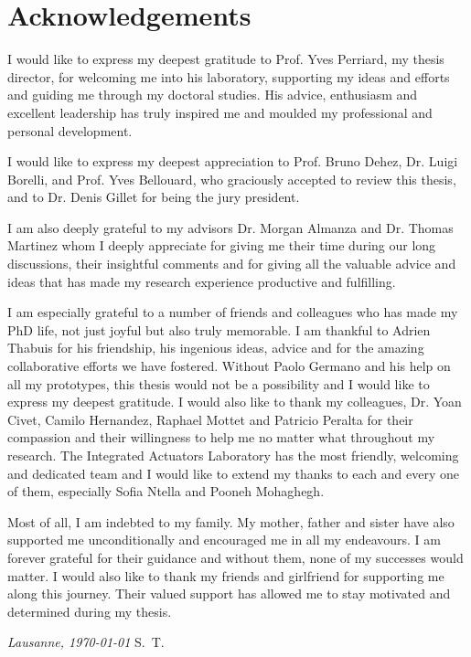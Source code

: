 \chapter*{Acknowledgements}
I would like to express my deepest gratitude to Prof. Yves Perriard, my thesis director, for welcoming me into his laboratory, supporting my ideas and efforts and guiding me through my doctoral studies. His advice, enthusiasm and excellent leadership has truly inspired me and moulded my professional and personal development.

I would like to express my deepest appreciation to Prof. Bruno Dehez, Dr. Luigi Borelli, and Prof. Yves Bellouard, who graciously accepted to review this thesis, and to Dr. Denis Gillet for being the jury president.

I am also deeply grateful to my advisors Dr. Morgan Almanza and Dr. Thomas Martinez whom I deeply appreciate for giving me their time during our long discussions, their insightful comments and for giving all the valuable advice and ideas that has made my research experience productive and fulfilling.

I am especially grateful to a number of friends and colleagues who has made my PhD life, not just joyful but also truly memorable. I am thankful to Adrien Thabuis for his friendship, his ingenious ideas, advice and for the amazing collaborative efforts we have fostered. Without Paolo Germano and his help on all my prototypes, this thesis would not be a possibility and I would like to express my deepest gratitude. I would also like to thank my colleagues, Dr. Yoan Civet, Camilo Hernandez, Raphael Mottet and Patricio Peralta for their compassion and their willingness to help me no matter what throughout my research. The Integrated Actuators Laboratory has the most friendly, welcoming and dedicated team and I would like to extend my thanks to each and every one of them, especially Sofia Ntella and Pooneh Mohaghegh.

Most of all, I am indebted to my family. My mother, father and sister have also supported me unconditionally and encouraged me in all my endeavours. I am forever grateful for their guidance and without them, none of my successes would matter. I would also like to thank my friends and girlfriend for supporting me along this journey. Their valued support has allowed me to stay motivated and determined during my thesis.
\bigskip

\noindent\textit{Lausanne, \today}
\hfill S.~T.
